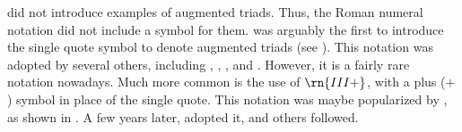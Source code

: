 
\textcite{weber1817versuch} did not introduce examples of
augmented triads. Thus, the Roman numeral notation did not
include a symbol for them. \textcite{richter1860lehrbuch}
was arguably the first to introduce the single quote symbol
to denote augmented triads (see
). This
notation was adopted by several others, including
\textcite{jadassohn1883lehrbuch},
\textcite{broekhoven1889system}, \textcite{buwa1893schule},
and \textcite{shepard1896harmony}. However, it is a fairly
rare notation nowadays. Much more common is the use of
$\rn{III+}$, with a plus ($+$) symbol in place of the single
quote. This notation was maybe popularized by
\textcite{riemann1890katechismus}, as shown in
. A few
years later, \textcite{chadwick1897harmony} adopted it, and
others followed. 


